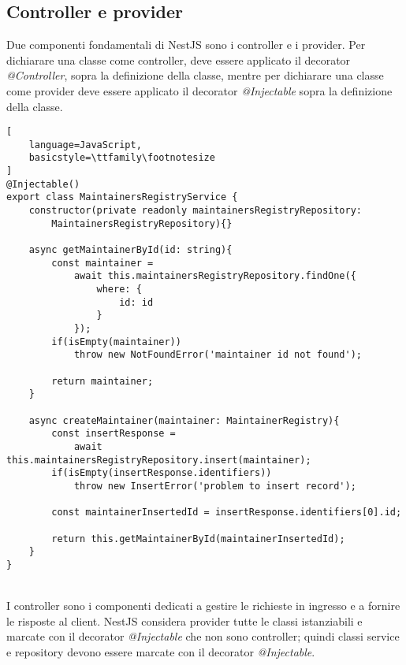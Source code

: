 \subsection{Controller e provider}
Due componenti fondamentali di NestJS sono i controller e i provider. 
Per dichiarare una classe come controller, deve essere applicato il decorator \textit{@Controller}, sopra la 
definizione della classe, mentre per dichiarare una classe come provider deve essere applicato il decorator
\textit{@Injectable} sopra la definizione della classe.
\\
\begin{lstlisting}[
    language=JavaScript,
    basicstyle=\ttfamily\footnotesize
]
@Injectable()
export class MaintainersRegistryService {
    constructor(private readonly maintainersRegistryRepository: 
        MaintainersRegistryRepository){}

    async getMaintainerById(id: string){
        const maintainer = 
            await this.maintainersRegistryRepository.findOne({
                where: {
                    id: id
                }
            });
        if(isEmpty(maintainer))
            throw new NotFoundError('maintainer id not found');

        return maintainer;
    }

    async createMaintainer(maintainer: MaintainerRegistry){
        const insertResponse = 
            await this.maintainersRegistryRepository.insert(maintainer);
        if(isEmpty(insertResponse.identifiers))
            throw new InsertError('problem to insert record');

        const maintainerInsertedId = insertResponse.identifiers[0].id;

        return this.getMaintainerById(maintainerInsertedId);
    }
}
\end{lstlisting}
\leavevmode\newline
\\
I controller sono i componenti dedicati a gestire le richieste in ingresso e a fornire le risposte al
client. NestJS considera provider tutte le classi istanziabili e marcate con il decorator 
\textit{@Injectable} che non sono controller; quindi classi service e repository devono essere marcate
con il decorator \textit{@Injectable}. 
\\
